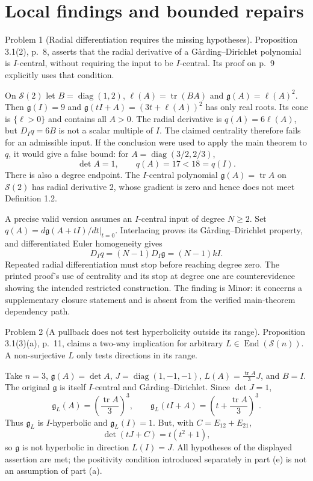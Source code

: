 \documentclass[10pt]{article}
\begin{document}
\section*{Local findings and bounded repairs}
Problem 1 (Radial differentiation requires the missing hypotheses).  Proposition 3.1(2), p. 8, asserts that the radial derivative of a Gårding–Dirichlet polynomial is \(I\)-central, without requiring the input to be \(I\)-central. Its proof on p. 9 explicitly uses that condition.\par
On \(\mathcal S(2)\) let \(B=\operatorname{diag}(1,2)\), \(\ell(A)=\operatorname{tr}(BA)\) and \(\mathfrak g(A)=\ell(A)^2\). Then \(\mathfrak g(I)=9\) and \(\mathfrak g(tI+A)=(3t+\ell(A))^2\) has only real roots. Its cone is \(\{\ell>0\}\) and contains all \(A>0\). The radial derivative is \(q(A)=6\ell(A)\), but \(D_Iq=6B\) is not a scalar multiple of \(I\). The claimed centrality therefore fails for an admissible input. If the conclusion were used to apply the main theorem to \(q\), it would give a false bound: for \(A=\operatorname{diag}(3/2,2/3)\), \[\det A=1,\qquad q(A)=17<18=q(I).\] There is also a degree endpoint. The \(I\)-central polynomial \(\mathfrak g(A)=\operatorname{tr}A\) on \(\mathcal S(2)\) has radial derivative \(2\), whose gradient is zero and hence does not meet Definition 1.2.\par
A precise valid version assumes an \(I\)-central input of degree \(N\geq2\). Set \(q(A)=d\mathfrak g(A+tI)/dt|_{t=0}\). Interlacing proves its Gårding–Dirichlet property, and differentiated Euler homogeneity gives \[D_Iq=(N-1)D_I\mathfrak g=(N-1)kI.\] Repeated radial differentiation must stop before reaching degree zero. The printed proof’s use of centrality and its stop at degree one are counterevidence showing the intended restricted construction. The finding is Minor: it concerns a supplementary closure statement and is absent from the verified main-theorem dependency path.\par
Problem 2 (A pullback does not test hyperbolicity outside its range).  Proposition 3.1(3)(a), p. 11, claims a two-way implication for arbitrary \(L\in\operatorname{End}(\mathcal S(n))\). A non-surjective \(L\) only tests directions in its range.\par
Take \(n=3\), \(\mathfrak g(A)=\det A\), \(J=\operatorname{diag}(1,-1,-1)\), \(L(A)=\frac{\operatorname{tr}A}{3}J\), and \(B=I\). The original \(\mathfrak g\) is itself \(I\)-central and Gårding–Dirichlet. Since \(\det J=1\), \[\mathfrak g_L(A)=\left(\frac{\operatorname{tr}A}{3}\right)^3,\qquad
 \mathfrak g_L(tI+A)=\left(t+\frac{\operatorname{tr}A}{3}\right)^3.\] Thus \(\mathfrak g_L\) is \(I\)-hyperbolic and \(\mathfrak g_L(I)=1\). But, with \(C=E_{12}+E_{21}\), \[\det(tJ+C)=t(t^2+1),\] so \(\mathfrak g\) is not hyperbolic in direction \(L(I)=J\). All hypotheses of the displayed assertion are met; the positivity condition introduced separately in part (e) is not an assumption of part (a).\par
\end{document}
